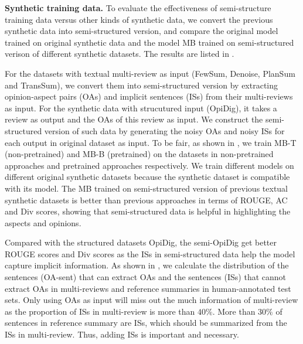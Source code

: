 \textbf{Synthetic training data.}
To evaluate the effectiveness of semi-structure training data versus
other kinds of synthetic data,
we convert the previous synthetic data into semi-structured version,
and compare the original model trained on original synthetic data 
and the model MB trained on semi-structured verison of different synthetic datasets.
The results are listed in .



For the datasets with textual multi-review as input (FewSum, Denoise, PlanSum and TransSum), 
we convert them into semi-structured version by extracting 
opinion-aspect pairs (OAs) and implicit sentences (ISs)
from their multi-reviews as input.
For the synthetic data with strucutured input (OpiDig),
it takes a review as output and the OAs of this review as input.
We construct the semi-structured version of such data
by generating the noisy OAs and noisy ISs for each output in original dataset as input.
To be fair, as shown in , we train MB-T (non-pretrained) and MB-B (pretrained) on the datasets %
in non-pretrained approaches and pretrained approaches respectively.
We train different models on different original synthetic datasets because
the synthetic dataset is compatible with its model.
The MB trained on semi-structured version of previous textual synthetic datasets
is better than previous approaches in terms of ROUGE, AC and Div scores,
showing that semi-structured data
is helpful in highlighting the aspects and opinions.



Compared with the structured datasets OpiDig, the semi-OpiDig get better ROUGE scores and Div scores as the ISs in semi-structured data help the model capture implicit information.
As shown in , we calculate the distribution of the sentences (OA-sent) that can extract OAs and the sentences (ISs) that cannot extract OAs in multi-reviews and reference summaries in human-annotated test sets.
Only using OAs as input will miss out the much information of multi-review
as the proportion of ISs in multi-review is more than $40\%$.
More than $30\%$ of sentences in reference summary are ISs, which should be summarized from the ISs in multi-review.
Thus, adding ISs is important and necessary.

